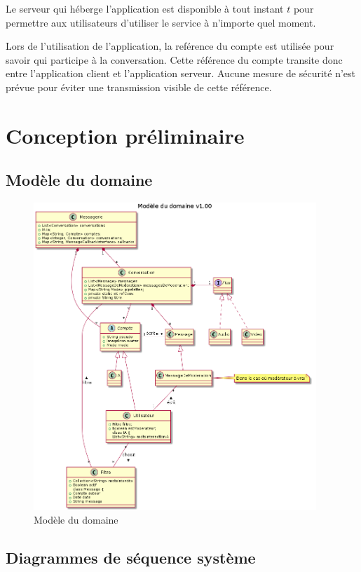 \documentclass[11pt,dvipsnames,svgnames]{report}
\begin{document}
Le serveur qui héberge l'application est disponible à tout instant $t$ pour permettre aux utilisateurs d'utiliser le service à n'importe quel moment.

Lors de l'utilisation de l'application, la reférence du compte est utilisée pour savoir qui participe à la conversation. Cette référence du compte transite donc entre l'application client et l'application serveur. Aucune mesure de sécurité n'est prévue pour éviter une transmission visible de cette référence.\\

\chapter{Conception préliminaire}

\section{Modèle du domaine}

\begin{figure}[H]
\centerline{\includegraphics[width=0.95\textwidth]{diagrammes/class-diag.png}}
\caption{Modèle du domaine}
\end{figure}

\section{Diagrammes de séquence système}
\end{document}
